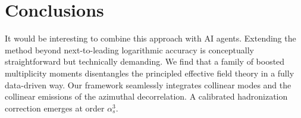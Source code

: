 \section{Conclusions}\label{sec:conclusions}

It would be interesting to combine this approach with AI agents.
Extending the method beyond next-to-leading logarithmic accuracy is
conceptually straightforward but technically demanding. We find that a
family of boosted multiplicity moments disentangles the principled
effective field theory in a fully data-driven way. Our framework
seamlessly integrates collinear modes and the collinear emissions of the
azimuthal decorrelation. A calibrated hadronization correction emerges
at order $\alpha_s^3$.

